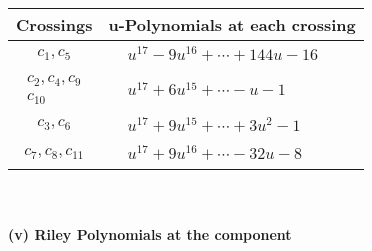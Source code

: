 \documentclass[1p]{elsarticle_modified}
\theoremstyle{definition}
\begin{document}
\begin{tabular}{m{50pt}|m{274pt}}
Crossings & \hspace{64pt}u-Polynomials at each crossing \\
\hline $$\begin{aligned}c_{1},c_{5}\end{aligned}$$&$\begin{aligned}
&u^{17}-9 u^{16}+\cdots+144 u-16
\end{aligned}$\\
\hline $$\begin{aligned}c_{2},c_{4},c_{9}\\c_{10}\end{aligned}$$&$\begin{aligned}
&u^{17}+6 u^{15}+\cdots- u-1
\end{aligned}$\\
\hline $$\begin{aligned}c_{3},c_{6}\end{aligned}$$&$\begin{aligned}
&u^{17}+9 u^{15}+\cdots+3 u^2-1
\end{aligned}$\\
\hline $$\begin{aligned}c_{7},c_{8},c_{11}\end{aligned}$$&$\begin{aligned}
&u^{17}+9 u^{16}+\cdots-32 u-8
\end{aligned}$\\
\hline
\end{tabular}\\~\\
\newpage\renewcommand{\arraystretch}{1}
\flushleft \textbf{(v) Riley Polynomials at the component}\newline \\
\end{document}
